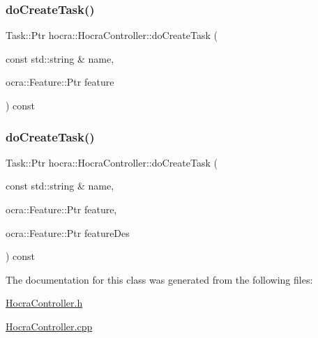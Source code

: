 \subsubsection{\texorpdfstring{do\+Create\+Task()}{doCreateTask()}\hspace{0.1cm}{\footnotesize\ttfamily [1/2]}}
{\footnotesize\ttfamily Task\+::\+Ptr hocra\+::\+Hocra\+Controller\+::do\+Create\+Task (\begin{DoxyParamCaption}\item[{const std\+::string \&}]{name,  }\item[{ocra\+::\+Feature\+::\+Ptr}]{feature }\end{DoxyParamCaption}) const}

\hypertarget{classhocra_1_1HocraController_a939752a2863f29c7d8be81aed6bac673}{}\label{classhocra_1_1HocraController_a939752a2863f29c7d8be81aed6bac673} 
\subsubsection{\texorpdfstring{do\+Create\+Task()}{doCreateTask()}\hspace{0.1cm}{\footnotesize\ttfamily [2/2]}}
{\footnotesize\ttfamily Task\+::\+Ptr hocra\+::\+Hocra\+Controller\+::do\+Create\+Task (\begin{DoxyParamCaption}\item[{const std\+::string \&}]{name,  }\item[{ocra\+::\+Feature\+::\+Ptr}]{feature,  }\item[{ocra\+::\+Feature\+::\+Ptr}]{feature\+Des }\end{DoxyParamCaption}) const}



The documentation for this class was generated from the following files\+:\begin{DoxyCompactItemize}
\item 
\hyperlink{HocraController_8h}{Hocra\+Controller.\+h}\item 
\hyperlink{HocraController_8cpp}{Hocra\+Controller.\+cpp}\end{DoxyCompactItemize}
